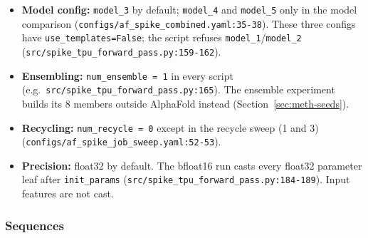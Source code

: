 \begin{itemize}
  \item \textbf{Model config:} \texttt{model\_3} by default; \texttt{model\_4} and \texttt{model\_5} only in the
    model comparison (\texttt{configs/\allowbreak{}af\_\allowbreak{}spike\_\allowbreak{}combined.yaml:35-38}). These three configs
    have \texttt{use\_templates=False}; the script refuses \texttt{model\_1}/\texttt{model\_2}
    (\texttt{src/\allowbreak{}spike\_\allowbreak{}tpu\_\allowbreak{}forward\_\allowbreak{}pass.py:159-162}).
  \item \textbf{Ensembling:} \texttt{num\_ensemble = 1} in every script (e.g.\
    \texttt{src/\allowbreak{}spike\_\allowbreak{}tpu\_\allowbreak{}forward\_\allowbreak{}pass.py:165}). The ensemble experiment builds its 8
    members outside AlphaFold instead (Section~\ref{sec:meth-seeds}).
  \item \textbf{Recycling:} \texttt{num\_recycle = 0} except in the recycle sweep (1 and 3)
    (\texttt{configs/\allowbreak{}af\_\allowbreak{}spike\_\allowbreak{}job\_\allowbreak{}sweep.yaml:52-53}).
  \item \textbf{Precision:} float32 by default. The bfloat16 run casts every float32
    parameter leaf after \texttt{init\_params} (\texttt{src/\allowbreak{}spike\_\allowbreak{}tpu\_\allowbreak{}forward\_\allowbreak{}pass.py:184-189}).
    Input features are not cast.
\end{itemize}

\subsubsection{Sequences}
\label{sec:meth-sequences}


